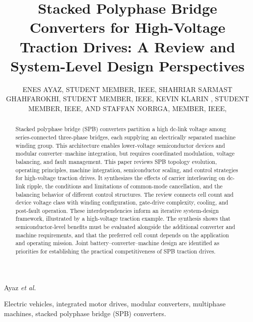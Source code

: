\documentclass{ieeeojpel}
\begin{document}

\title{Stacked Polyphase Bridge Converters for High-Voltage Traction Drives:
A Review and System-Level Design Perspectives}

\author{ENES AYAZ, STUDENT MEMBER, IEEE,
SHAHRIAR SARMAST GHAHFAROKHI, STUDENT MEMBER, IEEE,
KEVIN KLARIN , STUDENT MEMBER, IEEE, AND
STAFFAN NORRGA, MEMBER, IEEE, }
{Ayaz \textit{et al.}}

\begin{abstract}
Stacked polyphase bridge (SPB) converters partition a high dc-link voltage among series-connected three-phase bridges, each supplying an electrically separated machine winding group. 
This architecture enables lower-voltage semiconductor devices and modular converter--machine integration, but requires coordinated modulation, voltage balancing, and fault management. 
This paper reviews SPB topology evolution, operating principles, machine integration, semiconductor scaling, and control strategies for high-voltage traction drives. 
It synthesizes the effects of carrier interleaving on dc-link ripple, the conditions and limitations of common-mode cancellation, and the balancing behavior of different control structures.
 The review connects cell count and device voltage class with winding configuration, gate-drive complexity, cooling, and post-fault operation. 
 These interdependencies inform an iterative system-design framework, illustrated by a high-voltage traction example. 
 The synthesis shows that semiconductor-level benefits must be evaluated alongside the additional converter and machine requirements, 
 and that the preferred cell count depends on the application and operating mission. Joint battery--converter--machine design 
are identified as priorities for establishing the practical competitiveness of SPB traction drives.
\end{abstract}

\begin{IEEEkeywords}
Electric vehicles, integrated motor drives, modular converters,
multiphase machines, stacked polyphase bridge (SPB) converters.
\end{IEEEkeywords}

\maketitle
\end{document}
